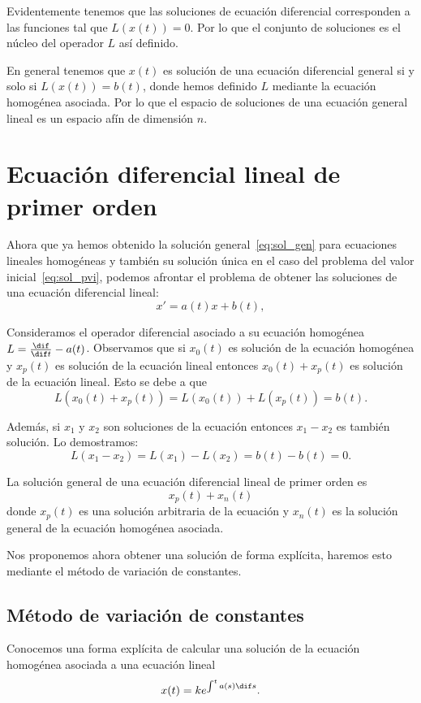 \documentclass[../main.tex]{subfiles}
\begin{document}
Evidentemente tenemos que las soluciones de ecuación diferencial 
corresponden a las funciones tal que \(L(x(t)) = 0\). Por lo que
el conjunto de soluciones es el núcleo del operador \(L\) así definido.

En general tenemos que \(x(t)\) es solución de una ecuación diferencial
general si y solo si \(L(x(t)) = b(t)\), donde hemos definido \(L\)
mediante la ecuación homogénea asociada. Por lo que el espacio de 
soluciones de una ecuación general lineal es un espacio afín de dimensión \(n\).

\section{Ecuación diferencial lineal de primer orden}

Ahora que ya hemos obtenido la solución general~\eqref{eq:sol_gen} para 
ecuaciones lineales homogéneas y también su solución única en el caso del 
problema del valor inicial~\eqref{eq:sol_pvi}, podemos afrontar el problema de
obtener las soluciones de una ecuación diferencial lineal:
\[x' = a(t)x + b(t),\]

Consideramos el operador diferencial asociado a su ecuación homogénea 
\(L = \frac{\dif}{\dif t} - a(t)\). Observamos que si \(x_0(t)\) es solución 
de la ecuación homogénea y \(x_p(t)\) es solución de la ecuación lineal entonces
\(x_0(t) + x_p(t)\) es solución de la ecuación lineal. Esto se debe a que
\[L(x_0(t) + x_p(t)) = L(x_0(t)) + L(x_p(t)) = b(t).\]

Además, si \(x_1\) y \(x_2\) son soluciones de la ecuación entonces 
\(x_1 - x_2\) es también solución. Lo demostramos:
\[L(x_1 - x_2) = L(x_1) - L(x_2) = b(t) - b(t) = 0.\]

\begin{theorem}
	La solución general de una ecuación diferencial lineal de primer orden es 
	\[x_p(t) + x_n(t)\]
	donde \(x_p(t)\) es una solución arbitraria de la ecuación y \(x_n(t)\) es
	la solución general de la ecuación homogénea asociada.
\end{theorem}

Nos proponemos ahora obtener una solución de forma explícita, haremos esto
mediante el método de variación de constantes.

\subsection{Método de variación de constantes}

Conocemos una forma explícita de calcular una solución de la ecuación homogénea
asociada a una ecuación lineal
\[x(t) = k e^{\int^t a(s) \dif s}.\]
\end{document}
